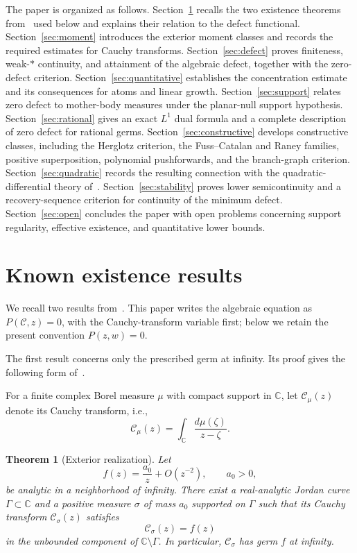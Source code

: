\documentclass[reqno]{amsart}
\newtheorem{theorem}{Theorem}[section]
\theoremstyle{definition}
\theoremstyle{remark}
\newcommand{\bC}{\mathbb C}
\newcommand{\Cauchy}{\mathcal C}
\begin{document}
The paper is organized as follows.  Section~\ref{sec:BoSh-background}
recalls the two existence theorems from~\cite{BoSh} used below and explains
their relation to the defect functional.  Section~\ref{sec:moment} introduces
the exterior moment classes and records the required estimates for Cauchy
transforms.  Section~\ref{sec:defect} proves finiteness, weak-$*$ continuity,
and attainment of the algebraic defect, together with the zero-defect
criterion.  Section~\ref{sec:quantitative} establishes the concentration
estimate and its consequences for atoms and linear growth.  Section~\ref{sec:support} relates zero defect to mother-body measures under
the planar-null support hypothesis.  Section~\ref{sec:rational} gives an exact $L^1$ dual formula and a
complete description of zero defect for rational germs.  Section~\ref{sec:constructive}
develops constructive classes, including the Herglotz criterion, the
Fuss--Catalan and Raney families, positive superposition, polynomial
pushforwards, and the branch-graph criterion.  Section~\ref{sec:quadratic}
records the resulting connection with the quadratic-differential theory
of~\cite{BoSh}.  Section~\ref{sec:stability} proves lower semicontinuity and a
recovery-sequence criterion for continuity of the minimum defect.  Section~\ref{sec:open} concludes the paper with open problems concerning
support regularity, effective existence, and quantitative lower bounds.

\section{Known existence results}\label{sec:BoSh-background}

We recall two results from~\cite{BoSh}.  This paper writes the algebraic equation
as $P(\Cauchy,z)=0$, with the Cauchy-transform variable first; below we retain the
present convention $P(z,w)=0$.

The first result concerns only the prescribed germ at infinity.  Its proof gives
the following form of~\cite[Theorem~1]{BoSh}. 

For a finite complex Borel measure
$\mu$ with compact support in $\bC$, let $\Cauchy_\mu(z)$ denote its Cauchy transform, i.e., 
\[
 \Cauchy_\mu(z)=\int_{\bC}\frac{d\mu(\zeta)}{z-\zeta}.
\]


\begin{theorem}[Exterior realization]
\label{thm:BoSh-exterior}
Let
\[
 f(z)=\frac{a_0}{z}+O(z^{-2}),\qquad a_0>0,
\]
be analytic in a neighborhood of infinity.  There exist a real-analytic Jordan
curve $\Gamma\subset\bC$ and a positive measure $\sigma$ of mass $a_0$ supported
on $\Gamma$ such that its Cauchy transform $ \Cauchy_\sigma(z)$ satisfies 
\[
 \Cauchy_\sigma(z)=f(z)
\]
in the unbounded component of $\bC\setminus\Gamma$.  In particular,
$\Cauchy_\sigma$ has germ $f$ at infinity.
\end{theorem}
\end{document}
